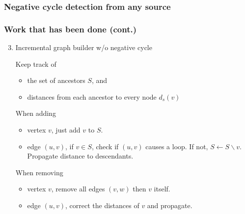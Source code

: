 \documentclass{beamer}
\begin{document}
\begin{frame}\frametitle{Negative cycle detection from any source}

\vspace*{8pt}

\begin{center}
\end{center}


\end{frame}


\begin{frame}[fragile]\frametitle{Work that has been done (cont.)}

\begin{enumerate}
\setcounter{enumi}{2}
\item Incremental graph builder w/o negative cycle\newline

Keep track of
\begin{itemize}
\item the set of ancestors $S$, and
\item distances from each ancestor to every node $d_s(v)$
\end{itemize}

When adding
\begin{itemize}
\item\alert{vertex $v$}, just add $v$ to $S$.
\item\alert{edge $(u,v)$}, if $v\in S$, check if $(u,v)$ causes a loop.\newline
If not, $S\leftarrow S\backslash v$. Propagate distance to descendants.
\end{itemize}

When removing
\begin{itemize}
\item\alert{vertex $v$}, remove all edges $(v,w)$ then $v$ itself.
\item\alert{edge $(u,v)$}, correct the distances of $v$ and propagate.
\end{itemize}

\end{enumerate}

\end{frame}
\end{document}
